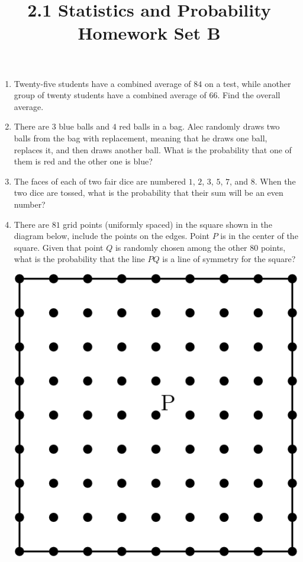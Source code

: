 \documentclass{article}
\title{2.1 Statistics and Probability Homework Set B}
\author{}
\date{}
\begin{document}
\maketitle
\begin{enumerate}
    \item Twenty-five students have a combined average of $84$ on a test, while
        another group of twenty students have a combined average of $66$. Find
        the overall average.
        \vspace{3cm}
    \item There are $3$ blue balls and $4$ red balls in a bag. Alec
        randomly draws two balls from the bag with replacement, meaning that
        he draws one ball, replaces it, and then draws another ball. What
        is the probability that one of them is red and the other one is
        blue?
    \vspace{3cm}
    \item The faces of each of two fair dice are numbered $1$, $2$, $3$, $5$, $7$, and $8$.
        When the two dice are tossed, what is the probability that their sum will be an even number?
        \vspace{3cm}
    \vspace{3cm}
    \item There are $81$ grid points (uniformly spaced) in the square shown in the diagram below, include the points on the edges.
        Point $P$ is in the center of the square.
        Given that point $Q$ is randomly chosen among the other $80$ points, what is the probability that the line $PQ$ is a line of symmetry for the square?
        \begin{center}
            \includegraphics[scale=0.25]{grid-points.png}

\end{center}
\end{enumerate}
\end{document}
